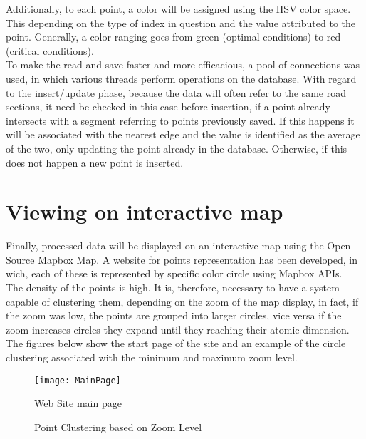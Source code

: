 \documentclass[tesi]{subfiles}
\begin{document}
\noindent Additionally, to each point, a color will be assigned using the HSV color space. This depending on the type of index in question and the value attributed to the point. Generally, a color ranging goes from green (optimal conditions) to red (critical conditions).\\

\noindent To make the read and save faster and more efficacious, a pool of connections was used, in which various threads perform operations on the database. With regard to the insert/update phase, because the data will often refer to the same road sections, it need be checked in this case before insertion, if a point already intersects with a segment referring to points previously saved. If this happens it will be associated with the nearest edge and the value is identified as the average of the two, only updating the point already in the database. Otherwise, if this does not happen a new point is inserted.



\section{Viewing on interactive map}\label{sc:Viewing on interactive map}
Finally, processed data will be displayed on an interactive map using the Open Source Mapbox Map. A website for points representation has been developed, in wich, each of these is represented by specific color circle using Mapbox APIs.\\

\noindent The density of the points is high. It is, therefore, necessary to have a system capable of clustering them, depending on the zoom of the map display, in fact, if the zoom was low, the points are grouped into larger circles, vice versa if the zoom increases circles they expand until they reaching their atomic dimension.\\
The figures below show the start page of the site and an example of the circle clustering associated with the minimum and maximum zoom level.

\begin{figure}[H]
\centering
\texttt{[image: MainPage]}
\caption{Web Site main page}
\end{figure}\label{fig:WebSite Main Page}

\begin{figure}[H]
  \centering
  
  \hspace{10mm}
  \caption{Point Clustering based on Zoom Level}
  \label{fig:Point Clustering based on Zoom Level}
\end{figure}
\clearpage
\end{document}
